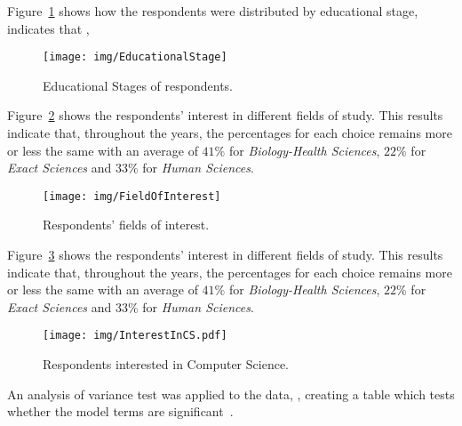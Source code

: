 Figure~\ref{fig:EducationalStage} shows how the respondents were distributed by educational stage, indicates that ,

\begin{figure}%
\texttt{[image: img/EducationalStage]}%
\caption{Educational Stages of respondents.}%
\label{fig:EducationalStage}%
\end{figure}%

Figure~\ref{fig:FieldOfInterest} shows the respondents' interest in different fields of study. This results indicate that, throughout the years, the percentages for each choice remains more or less the same with an average of $41\%$ for \emph{Biology-Health Sciences}, $22\%$ for \emph{Exact Sciences} and $33\%$ for \emph{Human Sciences}.

\begin{figure}%
\texttt{[image: img/FieldOfInterest]}%
\caption{Respondents' fields of interest.}%
\label{fig:FieldOfInterest}%
\end{figure}%

Figure~\ref{fig:InterestInCS.pdf} shows the respondents' interest in different fields of study. This results indicate that, throughout the years, the percentages for each choice remains more or less the same with an average of $41\%$ for \emph{Biology-Health Sciences}, $22\%$ for \emph{Exact Sciences} and $33\%$ for \emph{Human Sciences}.

\begin{figure}%
\texttt{[image: img/InterestInCS.pdf]}%
\caption{Respondents interested in Computer Science.}%
\label{fig:InterestInCS.pdf}%
\end{figure}%


An analysis of variance test was applied to the data, , creating a table which tests whether the model terms are significant~\cite{Chambers1990}.




